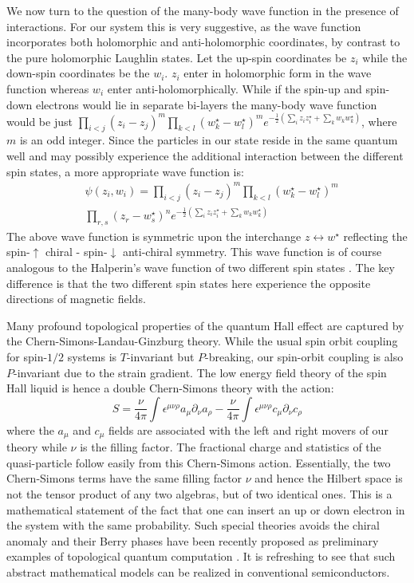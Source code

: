 \documentclass[prl,aps,amssymb,shownopacs,twocolumn]{revtex4}
\begin{document}
We now turn to the question of the many-body wave function in the
presence of interactions. For our system this is very suggestive, as
the wave function incorporates both holomorphic and anti-holomorphic
coordinates, by contrast to the pure holomorphic Laughlin states.
Let the up-spin coordinates be $z_i$ while the down-spin coordinates
be the $w_i$. $z_i$ enter in holomorphic form in the wave function
whereas $w_i$ enter anti-holomorphically. While if the spin-up and
spin-down electrons would lie in separate bi-layers the many-body
wave function would be just $\prod_{i<j} (z_i -z_j)^m \prod_{k<l}
(w^\star_k - w^\star_l)^m e^{-\frac{1}{2} (\sum_{i}z_i z_i^\star +
\sum_k w_k w_k^\star)}$, where $m$ is an odd integer. Since the
particles in our state reside in the same quantum well and may
possibly experience the additional interaction between the different
spin states, a more appropriate wave function is:
\begin{eqnarray}
& \psi(z_i, w_i) = \prod_{i<j} (z_i -z_j)^m \prod_{k<l} (w^\star_k
- w^\star_l)^m \nonumber \\ & \prod_{r,s} (z_r -w^\star_s)^n
e^{-\frac{1}{2} (\sum_{i} z_i z_i^\star + \sum_k w_k w_k^\star)}
\end{eqnarray}
\noindent The above wave function is symmetric upon the interchange
$z \leftrightarrow w^\star$ reflecting the spin-$\uparrow$ chiral -
spin-$\downarrow$ anti-chiral symmetry. This wave function is of
course analogous to the Halperin's wave function of two different
spin states \cite{halperin1983}. The key difference is that the two
different spin states here experience the opposite directions of
magnetic fields.

Many profound topological properties of the quantum Hall effect
are captured by the Chern-Simons-Landau-Ginzburg
theory\cite{zhang1989}. While the usual spin orbit coupling for
spin-$1/2$ systems is $T$-invariant but $P$-breaking, our
spin-orbit coupling is also $P$-invariant due to the strain
gradient. The low energy field theory of the spin Hall liquid is
hence a double Chern-Simons theory with the action:
\begin{equation}
S = \frac{\nu}{4 \pi} \int \epsilon^{\mu \nu \rho} a_\mu
\partial_\nu a_\rho - \frac{\nu}{4 \pi} \int \epsilon^{\mu \nu \rho}
c_\mu \partial_\nu c_\rho
\end{equation}
\noindent where the $a_\mu$ and $c_\mu$ fields are associated with
the left and right movers of our theory while $\nu$ is the filling
factor. The fractional charge and statistics of the quasi-particle
follow easily from this Chern-Simons action. Essentially, the two
Chern-Simons terms have the same filling factor $\nu$ and hence
the Hilbert space is not the tensor product of any two algebras,
but of two identical ones. This is a mathematical statement of the
fact that one can insert an up or down electron in the system with
the same probability. Such special theories avoids the chiral
anomaly \cite{freedman2003} and their Berry phases have been
recently proposed as preliminary examples of topological quantum
computation \cite{freedman2003}. It is refreshing to see that such
abstract mathematical models can be realized in conventional
semiconductors.
\end{document}
